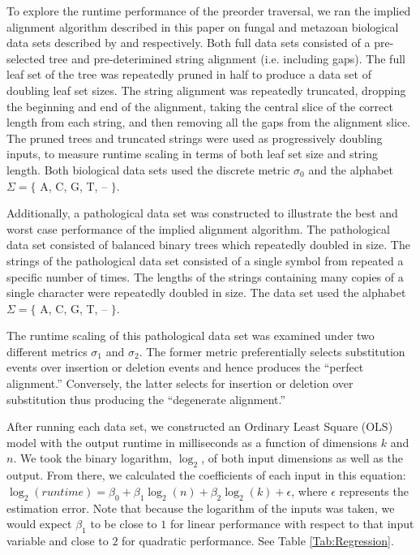 \documentclass[11pt]{article}
\begin{document}
To explore the runtime performance of the preorder traversal, we ran the implied alignment algorithm described in this paper on fungal and metazoan biological data sets described by \cite{GiribetandWheeler1999} and \cite{GiribetandWheeler2001} respectively.
Both full data sets consisted of a pre-selected tree and pre-deterimined string alignment (i.e. including gaps).
The full leaf set of the tree was repeatedly pruned in half to produce a data set of doubling leaf set sizes.
The string alignment was repeatedly truncated, dropping the beginning and end of the alignment, taking the central slice of the correct length from each string, and then removing all the gaps from the alignment slice.
The pruned trees and truncated strings were used as progressively doubling inputs, to measure runtime scaling in terms of both leaf set size and string length.
Both biological data sets used the discrete metric $\sigma_0$ and the alphabet $\Sigma = \{$ A, C, G, T, -- $\}$.

Additionally, a pathological data set was constructed to illustrate the best and worst case performance of the implied alignment algorithm.
The pathological data set consisted of balanced binary trees which repeatedly doubled in size.
The strings of the pathological data set consisted of a single symbol from repeated a specific number of times.
The lengths of the strings containing many copies of a single character were repeatedly doubled in size.
The data set used the alphabet $\Sigma = \{$ A, C, G, T, -- $\}$.

The runtime scaling of this pathological data set was examined under two different metrics $\sigma_1$ and $\sigma_2$.
The former metric preferentially selects substitution events over insertion or deletion events and hence produces the ``perfect alignment.''
Conversely, the latter selects for insertion or deletion over substitution thus producing the ``degenerate alignment.''


After running each data set, we constructed an Ordinary Least Square (OLS) model with the output runtime in milliseconds as a function of dimensions $k$ and $n$.
We took the binary logarithm, $\log_{2}$, of both input dimensions as well as the output.
From there, we calculated the coefficients of each input in this equation: $\log_2(runtime) = \beta_0 + \beta_1 \log_2(n) + \beta_2 \log_2(k) + \epsilon$, where $\epsilon$ represents the estimation error.
Note that because the logarithm of the inputs was taken, we would expect $\beta_1$ to be close to $1$ for linear performance with respect to that input variable and close to $2$ for quadratic performance.
See Table \ref{Tab:Regression}.
\end{document}
